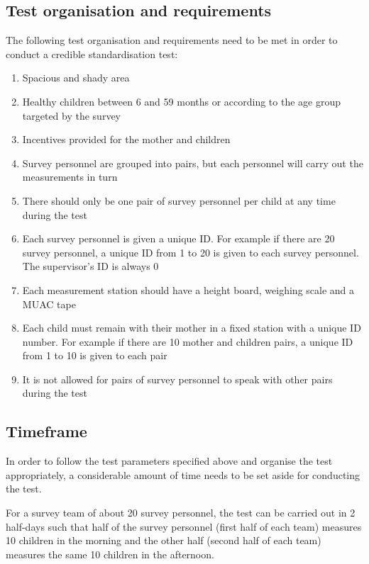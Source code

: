 \documentclass[12pt,]{book}
\theoremstyle{definition}
\theoremstyle{definition}
\theoremstyle{definition}
\theoremstyle{remark}
\begin{document}
\hypertarget{test-organisation-and-requirements}{%
\subsection{Test organisation and
requirements}\label{test-organisation-and-requirements}}

The following test organisation and requirements need to be met in order
to conduct a credible standardisation test:

\begin{enumerate}
\def\labelenumi{\arabic{enumi}.}
\item
  Spacious and shady area
\item
  Healthy children between 6 and 59 months or according to the age group
  targeted by the survey
\item
  Incentives provided for the mother and children
\item
  Survey personnel are grouped into pairs, but each personnel will carry
  out the measurements in turn
\item
  There should only be one pair of survey personnel per child at any
  time during the test
\item
  Each survey personnel is given a unique ID. For example if there are
  20 survey personnel, a unique ID from 1 to 20 is given to each survey
  personnel. The supervisor's ID is always 0
\item
  Each measurement station should have a height board, weighing scale
  and a MUAC tape
\item
  Each child must remain with their mother in a fixed station with a
  unique ID number. For example if there are 10 mother and children
  pairs, a unique ID from 1 to 10 is given to each pair
\item
  It is not allowed for pairs of survey personnel to speak with other
  pairs during the test
\end{enumerate}

\hypertarget{timeframe}{%
\subsection{Timeframe}\label{timeframe}}

In order to follow the test parameters specified above and organise the
test appropriately, a considerable amount of time needs to be set aside
for conducting the test.

For a survey team of about 20 survey personnel, the test can be carried
out in 2 half-days such that half of the survey personnel (first half of
each team) measures 10 children in the morning and the other half
(second half of each team) measures the same 10 children in the
afternoon.
\end{document}
